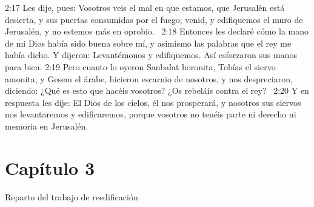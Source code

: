 2:17 Les dije, pues: Vosotros veis el mal en que estamos, que Jerusalén está desierta, y sus puertas consumidas por el fuego; venid, y edifiquemos el muro de Jerusalén, y no estemos más en oprobio.  
2:18 Entonces les declaré cómo la mano de mi Dios había sido buena sobre mí, y asimismo las palabras que el rey me había dicho. Y dijeron: Levantémonos y edifiquemos. Así esforzaron sus manos para bien. 
2:19 Pero cuanto lo oyeron Sanbalat horonita, Tobías el siervo amonita, y Gesem el árabe, hicieron escarnio de nosotros, y nos despreciaron, diciendo: ¿Qué es esto que hacéis vosotros? ¿Os rebeláis contra el rey?  
2:20 Y en respuesta les dije: El Dios de los cielos, él nos prosperará, y nosotros sus siervos nos levantaremos y edificaremos, porque vosotros no tenéis parte ni derecho ni memoria en Jerusalén.  
\section*{Capítulo 3 }
Reparto del trabajo de reedificación  

